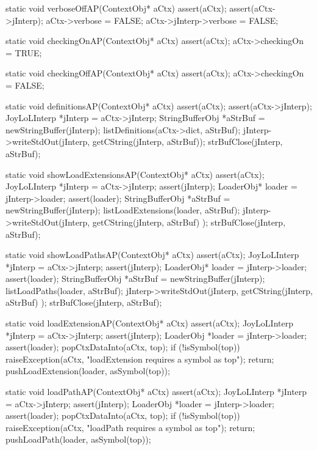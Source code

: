 \startCCode
static void verboseOffAP(ContextObj* aCtx) {
  assert(aCtx);
  assert(aCtx->jInterp);
  aCtx->verbose = FALSE;
  aCtx->jInterp->verbose = FALSE;
}
\stopCCode

\startCCode
static void checkingOnAP(ContextObj* aCtx) {
  assert(aCtx);
  aCtx->checkingOn = TRUE;
}
\stopCCode

\startCCode
static void checkingOffAP(ContextObj* aCtx) {
  assert(aCtx);
  aCtx->checkingOn = FALSE;
}
\stopCCode

\startCCode
static void definitionsAP(ContextObj* aCtx) {
  assert(aCtx);
  assert(aCtx->jInterp);
  JoyLoLInterp *jInterp = aCtx->jInterp;
  StringBufferObj *aStrBuf = newStringBuffer(jInterp);
  listDefinitions(aCtx->dict, aStrBuf);
  jInterp->writeStdOut(jInterp, getCString(jInterp, aStrBuf));
  strBufClose(jInterp, aStrBuf);
}
\stopCCode

\startCCode
static void showLoadExtensionsAP(ContextObj* aCtx) {
  assert(aCtx);
  JoyLoLInterp *jInterp = aCtx->jInterp;
  assert(jInterp);
  LoaderObj* loader = jInterp->loader;
  assert(loader);
  StringBufferObj *aStrBuf =
    newStringBuffer(jInterp);
  listLoadExtensions(loader, aStrBuf);
  jInterp->writeStdOut(jInterp,
    getCString(jInterp, aStrBuf)
  );
  strBufClose(jInterp, aStrBuf);
}
\stopCCode

\startCCode
static void showLoadPathsAP(ContextObj* aCtx) {
  assert(aCtx);
  JoyLoLInterp *jInterp = aCtx->jInterp;
  assert(jInterp);
  LoaderObj* loader = jInterp->loader;
  assert(loader);
  StringBufferObj *aStrBuf =
    newStringBuffer(jInterp);
  listLoadPaths(loader, aStrBuf);
  jInterp->writeStdOut(jInterp,
    getCString(jInterp, aStrBuf)
  );
  strBufClose(jInterp, aStrBuf);  
}
\stopCCode

\startCCode
static void loadExtensionAP(ContextObj* aCtx) {
  assert(aCtx);
  JoyLoLInterp *jInterp = aCtx->jInterp;
  assert(jInterp);
  LoaderObj *loader = jInterp->loader;
  assert(loader);
  popCtxDataInto(aCtx, top);
  if (!isSymbol(top)) {
    raiseException(aCtx,
      "loadExtension requires a symbol as top");
    return;
  }
  pushLoadExtension(loader, asSymbol(top));
}
\stopCCode

\startCCode
static void loadPathAP(ContextObj* aCtx) {
  assert(aCtx);
  JoyLoLInterp *jInterp = aCtx->jInterp;
  assert(jInterp);
  LoaderObj *loader = jInterp->loader;
  assert(loader);
  popCtxDataInto(aCtx, top);
  if (!isSymbol(top)) {
    raiseException(aCtx,
      "loadPath requires a symbol as top");
    return;
  }
  pushLoadPath(loader, asSymbol(top));
}
\stopCCode

